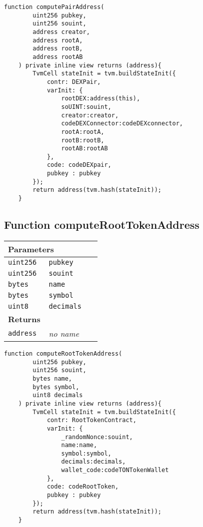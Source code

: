 \vspace{2cm}

\begin{lstlisting}[firstnumber=146]
	function computePairAddress(
		uint256 pubkey,
		uint256 souint,
		address creator,
		address rootA,
		address rootB,
		address rootAB
	) private inline view returns (address){
		TvmCell stateInit = tvm.buildStateInit({
			contr: DEXPair,
			varInit: {
				rootDEX:address(this),
				soUINT:souint,
				creator:creator,
				codeDEXConnector:codeDEXconnector,
				rootA:rootA,
				rootB:rootB,
				rootAB:rootAB
			},
			code: codeDEXpair,
			pubkey : pubkey
		});
		return address(tvm.hash(stateInit));
	}
\end{lstlisting}

\subsection{Function computeRootTokenAddress}


\ifsoltables
\noindent\begin{tabular}{|l|l|p{5cm}|}\hline
\multicolumn{3}{|l|}{\bf Parameters}\\\hline
\tt uint256 & \tt pubkey &\\\hline
\tt uint256 & \tt souint &\\\hline
\tt bytes & \tt name &\\\hline
\tt bytes & \tt symbol &\\\hline
\tt uint8 & \tt decimals &\\\hline
\multicolumn{3}{|l|}{\bf Returns}\\\hline
\tt address & {\em no name} &\\\hline
\end{tabular}
\fi

\vspace{2cm}

\begin{lstlisting}[firstnumber=182]
	function computeRootTokenAddress(
		uint256 pubkey,
		uint256 souint,
		bytes name,
		bytes symbol,
		uint8 decimals
	) private inline view returns (address){
		TvmCell stateInit = tvm.buildStateInit({
			contr: RootTokenContract,
			varInit: {
				_randomNonce:souint,
				name:name,
				symbol:symbol,
				decimals:decimals,
				wallet_code:codeTONTokenWallet
			},
			code: codeRootToken,
			pubkey : pubkey
		});
		return address(tvm.hash(stateInit));
	}
\end{lstlisting}
